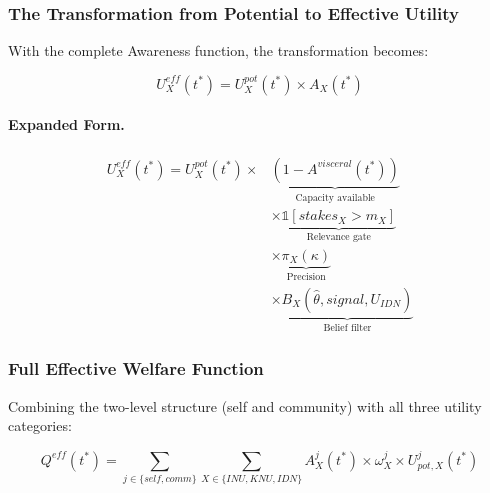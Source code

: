 \subsubsection{The Transformation from Potential to Effective Utility}
\label{subsubsec:transformation}

With the complete Awareness function, the transformation becomes:

\begin{equation}
\boxed{
U^{eff}_X(t^*) = U^{pot}_X(t^*) \times A_X(t^*)
}
\label{eq:basic-transformation}
\end{equation}

\paragraph{Expanded Form.}

\begin{align}
U^{eff}_X(t^*) = U^{pot}_X(t^*) \times 
& \underbrace{(1 - A^{visceral}(t^*))}_{\text{Capacity available}} \nonumber \\
& \times \underbrace{\mathbb{1}[stakes_X > m_X]}_{\text{Relevance gate}} \nonumber \\
& \times \underbrace{\pi_X(\kappa)}_{\text{Precision}} \nonumber \\
& \times \underbrace{B_X(\hat{\theta}, signal, U_{IDN})}_{\text{Belief filter}}
\label{eq:expanded-transformation}
\end{align}

\subsubsection{Full Effective Welfare Function}
\label{subsubsec:full-effective-welfare}

Combining the two-level structure (self and community) with all three
utility categories:

\begin{equation}
\boxed{
Q^{eff}(t^*) = \sum_{j \in \{self, comm\}} \sum_{X \in \{INU, KNU, IDN\}} A^j_X(t^*) \times \omega^j_X \times U^j_{pot,X}(t^*)
}
\label{eq:effective-welfare-complete}
\end{equation}

